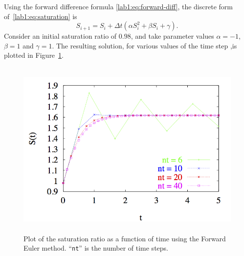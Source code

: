 \begin{example}
  Using the forward difference formula \eqref{lab1:eq:forward-diff}, the
  discrete form of~\eqref{lab1:eq:saturation} is 
  \[
  S_{i+1} = S_i + \Delta t \left( \alpha S_i^2 + \beta S_i +
    \gamma \right).
  \]
  Consider an initial saturation ratio of $0.98$, and take parameter
  values $\alpha=-1$, $\beta=1$ and $\gamma=1$.  
  The resulting solution, for various values of the time step \dt,is
  plotted in Figure~\ref{lab1:fig:saturation}. 
  \begin{figure}[htbp]
    \begin{center}
      \leavevmode
      \includegraphics[height=3.5in]{feuler/sat2}      
      \caption{Plot of the saturation ratio as a function of time
        using the Forward Euler method. ``{\tt{nt}}'' is the number of
        time steps.}
      \label{lab1:fig:saturation}
    \end{center}
  \end{figure}

%


\end{example}
